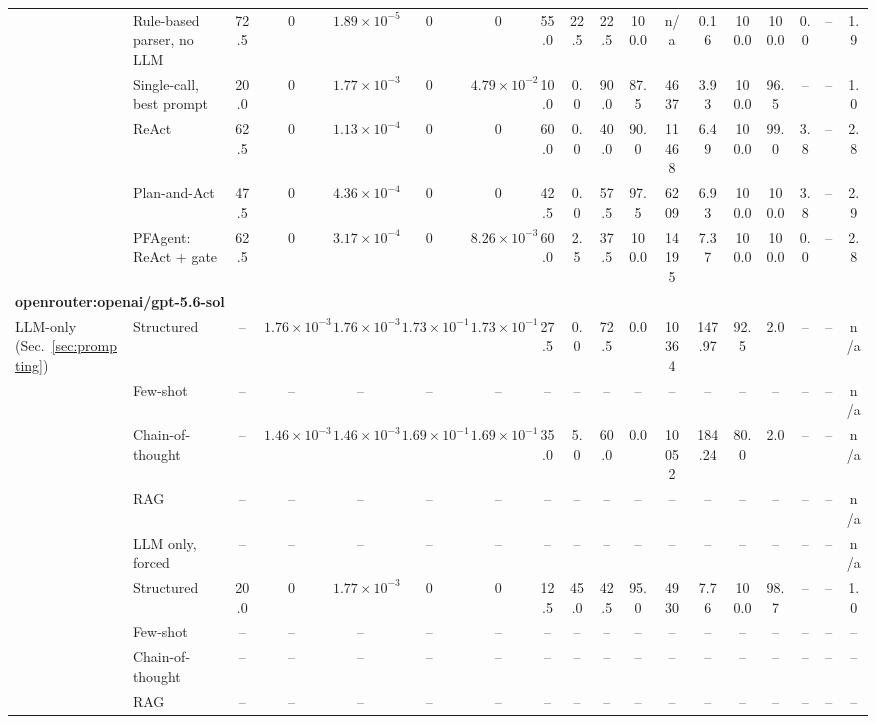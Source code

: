 {\begin{tabular}{ll ccccc cccc cc c cc cc}
\addlinespace
\multirow{5}{*}{Architectures (Sec.~\ref{sec:agents})} & Rule-based parser, no LLM & 72.5 & 0 & $1.89{\times}10^{-5}$ & 0 & 0 & 55.0 & 22.5 & 22.5 & 100.0 & n/a & 0.16 & 100.0 & 100.0 & 0.0 & -- & 1.9 \\
 & Single-call, best prompt & 20.0 & 0 & $1.77{\times}10^{-3}$ & 0 & $4.79{\times}10^{-2}$ & 10.0 & 0.0 & 90.0 & 87.5 & 4637 & 3.93 & 100.0 & 96.5 & -- & -- & 1.0 \\
 & ReAct & 62.5 & 0 & $1.13{\times}10^{-4}$ & 0 & 0 & 60.0 & 0.0 & 40.0 & 90.0 & 11468 & 6.49 & 100.0 & 99.0 & 3.8 & -- & 2.8 \\
 & Plan-and-Act & 47.5 & 0 & $4.36{\times}10^{-4}$ & 0 & 0 & 42.5 & 0.0 & 57.5 & 97.5 & 6209 & 6.93 & 100.0 & 100.0 & 3.8 & -- & 2.9 \\
 & PFAgent: ReAct + gate & 62.5 & 0 & $3.17{\times}10^{-4}$ & 0 & $8.26{\times}10^{-3}$ & 60.0 & 2.5 & 37.5 & 100.0 & 14195 & 7.37 & 100.0 & 100.0 & 0.0 & -- & 2.8 \\
\midrule
\multicolumn{18}{l}{\textbf{openrouter:openai/gpt-5.6-sol}} \\
\multirow{5}{*}{LLM-only (Sec.~\ref{sec:prompting})} & Structured & -- & $1.76{\times}10^{-3}$ & $1.76{\times}10^{-3}$ & $1.73{\times}10^{-1}$ & $1.73{\times}10^{-1}$ & 27.5 & 0.0 & 72.5 & 0.0 & 10364 & 147.97 & 92.5 & 2.0 & -- & -- & n/a \\
 & Few-shot & -- & -- & -- & -- & -- & -- & -- & -- & -- & -- & -- & -- & -- & -- & -- & n/a \\
 & Chain-of-thought & -- & $1.46{\times}10^{-3}$ & $1.46{\times}10^{-3}$ & $1.69{\times}10^{-1}$ & $1.69{\times}10^{-1}$ & 35.0 & 5.0 & 60.0 & 0.0 & 10052 & 184.24 & 80.0 & 2.0 & -- & -- & n/a \\
 & RAG & -- & -- & -- & -- & -- & -- & -- & -- & -- & -- & -- & -- & -- & -- & -- & n/a \\
 & LLM only, forced & -- & -- & -- & -- & -- & -- & -- & -- & -- & -- & -- & -- & -- & -- & -- & n/a \\
\addlinespace
\multirow{4}{*}{Single-call (Sec.~\ref{sec:prompting})} & Structured & 20.0 & 0 & $1.77{\times}10^{-3}$ & 0 & 0 & 12.5 & 45.0 & 42.5 & 95.0 & 4930 & 7.76 & 100.0 & 98.7 & -- & -- & 1.0 \\
 & Few-shot & -- & -- & -- & -- & -- & -- & -- & -- & -- & -- & -- & -- & -- & -- & -- & -- \\
 & Chain-of-thought & -- & -- & -- & -- & -- & -- & -- & -- & -- & -- & -- & -- & -- & -- & -- & -- \\
 & RAG & -- & -- & -- & -- & -- & -- & -- & -- & -- & -- & -- & -- & -- & -- & -- & -- \\

\end{tabular}}
